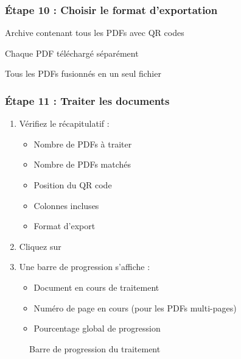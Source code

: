 \subsubsection{Étape 10 : Choisir le format d'exportation}

\begin{description}[leftmargin=3.5cm]
    \item[ZIP (défaut)] Archive contenant tous les PDFs avec QR codes
    \item[Fichiers individuels] Chaque PDF téléchargé séparément
    \item[PDF unique] Tous les PDFs fusionnés en un seul fichier
\end{description}

\subsubsection{Étape 11 : Traiter les documents}

\begin{enumerate}[leftmargin=*]
    \item Vérifiez le récapitulatif :
    \begin{itemize}
        \item Nombre de PDFs à traiter
        \item Nombre de PDFs matchés
        \item Position du QR code
        \item Colonnes incluses
        \item Format d'export
    \end{itemize}
    \item Cliquez sur 
    \item Une barre de progression s'affiche :
    \begin{itemize}
        \item Document en cours de traitement
        \item Numéro de page en cours (pour les PDFs multi-pages)
        \item Pourcentage global de progression
    \end{itemize}
\end{enumerate}

\begin{figure}[h]
    \centering
    \caption{Barre de progression du traitement}
\end{figure}

